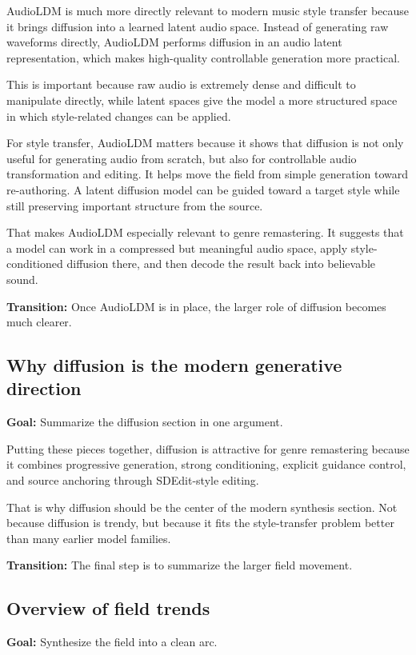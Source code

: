 \documentclass[11pt]{article}
\begin{document}
AudioLDM is much more directly relevant to modern music style transfer because it brings diffusion into a learned latent audio space. Instead of generating raw waveforms directly, AudioLDM performs diffusion in an audio latent representation, which makes high-quality controllable generation more practical.

This is important because raw audio is extremely dense and difficult to manipulate directly, while latent spaces give the model a more structured space in which style-related changes can be applied.

For style transfer, AudioLDM matters because it shows that diffusion is not only useful for generating audio from scratch, but also for controllable audio transformation and editing. It helps move the field from simple generation toward re-authoring. A latent diffusion model can be guided toward a target style while still preserving important structure from the source.

That makes AudioLDM especially relevant to genre remastering. It suggests that a model can work in a compressed but meaningful audio space, apply style-conditioned diffusion there, and then decode the result back into believable sound.

\textbf{Transition:} Once AudioLDM is in place, the larger role of diffusion becomes much clearer.

\subsection*{Why diffusion is the modern generative direction}
\textbf{Goal:} Summarize the diffusion section in one argument.

Putting these pieces together, diffusion is attractive for genre remastering because it combines progressive generation, strong conditioning, explicit guidance control, and source anchoring through SDEdit-style editing.

That is why diffusion should be the center of the modern synthesis section. Not because diffusion is trendy, but because it fits the style-transfer problem better than many earlier model families.

\textbf{Transition:} The final step is to summarize the larger field movement.

\subsection*{Overview of field trends}
\textbf{Goal:} Synthesize the field into a clean arc.
\end{document}
